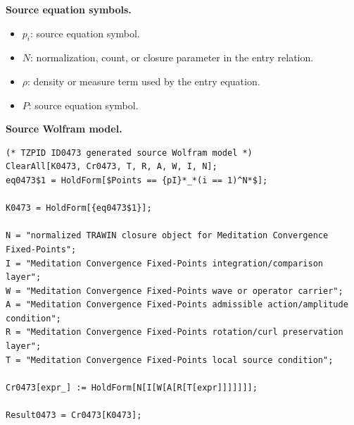 \begin{minipage}[t]{0.49\linewidth}
\begingroup
\small
\raggedright
\textbf{Source equation symbols.}\par
\begin{itemize}[leftmargin=1.35em,itemsep=1pt,topsep=1pt,parsep=0pt]
    \item $p_i$: source equation symbol.
    \item $N$: normalization, count, or closure parameter in the entry relation.
    \item $\rho$: density or measure term used by the entry equation.
    \item $P$: source equation symbol.
\end{itemize}
\endgroup
\end{minipage}\hfill
\begin{minipage}[t]{0.47\linewidth}
\begingroup
\scriptsize
\raggedright
\textbf{Source Wolfram model.}\par
\begin{Verbatim}[fontsize=\tiny,breaklines=true,breakanywhere=true]
(* TZPID ID0473 generated source Wolfram model *)
ClearAll[K0473, Cr0473, T, R, A, W, I, N];
eq0473$1 = HoldForm[$Points == {pI}*_*(i == 1)^N*$];

K0473 = HoldForm[{eq0473$1}];

N = "normalized TRAWIN closure object for Meditation Convergence Fixed-Points";
I = "Meditation Convergence Fixed-Points integration/comparison layer";
W = "Meditation Convergence Fixed-Points wave or operator carrier";
A = "Meditation Convergence Fixed-Points admissible action/amplitude condition";
R = "Meditation Convergence Fixed-Points rotation/curl preservation layer";
T = "Meditation Convergence Fixed-Points local source condition";

Cr0473[expr_] := HoldForm[N[I[W[A[R[T[expr]]]]]]];

Result0473 = Cr0473[K0473];
\end{Verbatim}
\endgroup
\end{minipage}

